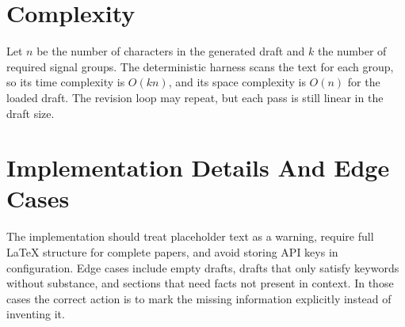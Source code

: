 \documentclass[11pt]{article}
\begin{document}
\section{Complexity}
Let $n$ be the number of characters in the generated draft and $k$ the number of required signal groups. The deterministic harness scans the text for each group, so its time complexity is $O(kn)$, and its space complexity is $O(n)$ for the loaded draft. The revision loop may repeat, but each pass is still linear in the draft size.

\section{Implementation Details And Edge Cases}
The implementation should treat placeholder text as a warning, require full LaTeX structure for complete papers, and avoid storing API keys in configuration. Edge cases include empty drafts, drafts that only satisfy keywords without substance, and sections that need facts not present in context. In those cases the correct action is to mark the missing information explicitly instead of inventing it.
\end{document}

